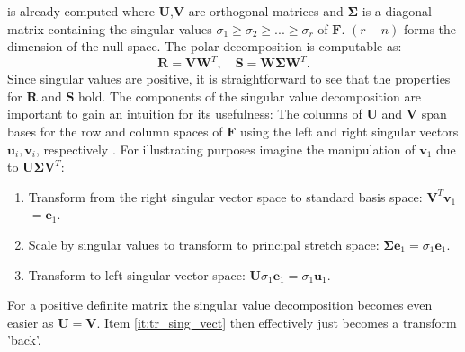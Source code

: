 \documentclass[m,times]{cgMA}
\begin{document}
is already computed where $\boldsymbol{U}$,$\boldsymbol{V}$ are orthogonal matrices and $\boldsymbol{\Sigma}$ is a diagonal matrix containing the singular values $\sigma_1 \geq \sigma_2 \geq ... \geq \sigma_r$ of $\boldsymbol{F}$. $(r-n)$ forms the dimension of the null space. The polar decomposition is computable as:
\begin{equation}
  \boldsymbol{R} = \boldsymbol{V} \boldsymbol{W} ^ { T }, \quad \boldsymbol{S} = \boldsymbol{W} \boldsymbol{\Sigma} \boldsymbol{W} ^ { T }.
\end{equation}
Since singular values are positive, it is straightforward to see that the properties for $\boldsymbol{R}$ and $\boldsymbol{S}$ hold.
The components of the singular value decomposition are important to gain an intuition for its usefulness: The columns of $\boldsymbol{U}$ and $\boldsymbol{V}$ span bases for the row and column spaces of $\boldsymbol{F}$ using the left and right singular vectors $\boldsymbol{u}_i,\boldsymbol{v}_i$, respectively \cite{MIT:SVD}. For illustrating purposes imagine the manipulation of $\boldsymbol{v}_1$ due to $\boldsymbol{U\Sigma V}^T$:
\begin{enumerate}
  \item Transform from the right singular vector space to standard basis space: $\boldsymbol{V}^T\boldsymbol{v}_1$ $ = \boldsymbol{e}_1$.
  \item Scale by singular values to transform to principal stretch space: $\boldsymbol{\Sigma} \boldsymbol{e}_1 = \sigma_1 \boldsymbol{e}_1$.
  \item \label{it:tr_sing_vect} Transform to left singular vector space: $\boldsymbol{U}\sigma_1\boldsymbol{e}_1 = \sigma_1 \boldsymbol{u}_{1}$.
\end{enumerate}
For a positive definite matrix the singular value decomposition becomes even easier as $\boldsymbol{U}=\boldsymbol{V}$. Item \ref{it:tr_sing_vect} then effectively just becomes a transform 'back'.
\end{document}
